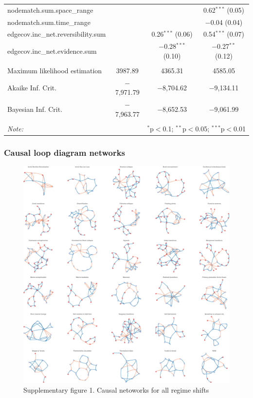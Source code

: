 \documentclass[9pt,]{article}
\begin{document}
\begin{tabular}{@{\extracolsep{5pt}}lccc}
  nodematch.sum.space\_range &  &  & 0.62$^{***}$ (0.05) \\
  nodematch.sum.time\_range &  &  & $-$0.04 (0.04) \\
  edgecov.inc\_net.reversibility.sum &  & 0.26$^{***}$ (0.06) & 0.54$^{***}$ (0.07) \\
  edgecov.inc\_net.evidence.sum &  & $-$0.28$^{***}$ (0.10) & $-$0.27$^{**}$ (0.12) \\
 \hline \\[-1.8ex]
Maximum likelihood estimation & 3987.89 & 4365.31 & 4585.05 \\
Akaike Inf. Crit. & $-$7,971.79 & $-$8,704.62 & $-$9,134.11 \\
Bayesian Inf. Crit. & $-$7,963.77 & $-$8,652.53 & $-$9,061.99 \\
\hline
\hline \\[-1.8ex]
\textit{Note:}  & \multicolumn{3}{r}{$^{*}$p$<$0.1; $^{**}$p$<$0.05; $^{***}$p$<$0.01} \\
\end{tabular}

\endgroup

\pagebreak

\subsubsection{Causal loop diagram
networks}\label{causal-loop-diagram-networks}

\begin{figure}

{\centering \includegraphics{170830_draftCascadingEffects_files/figure-latex/supp1-1} 

}

\caption{Supplementary figure 1. Causal netoworks for all regime shifts}\label{fig:supp1}
\end{figure}
\end{document}
